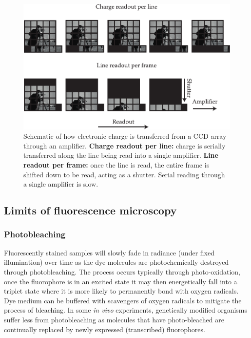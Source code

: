 \begin{figure}
    \centering
    \includegraphics{./sensor_chips}
    \caption[Schematic of how electronic charge is transferred from a \gls{CCD} array through an amplifier]{Schematic of how electronic charge is transferred from a \gls{CCD} array through an amplifier.
    \textbf{Charge readout per line:} charge is serially transferred along the line being read into a single amplifier.
    \textbf{Line readout per frame:} once the line is read, the entire frame is shifted down to be read, acting as a shutter.
    Serial reading through a single amplifier is slow.}\label{fig:sensor_chips}
\end{figure}



\subsection{Limits of fluorescence microscopy}

\subsubsection{Photobleaching}

Fluorescently stained samples will slowly fade in radiance (under fixed illumination) over time as the dye molecules are photochemically destroyed through photobleaching.
The process occurs typically through photo-oxidation, once the \gls{fluorophore} is in an excited state it may then energetically fall into a triplet state where it is more likely to permanently bond with oxygen radicals.
Dye medium can be buffered with scavengers of oxygen radicals to mitigate the process of bleaching.
In some \emph{in vivo} experiments, genetically modified organisms suffer less from photobleaching as molecules that have photo-bleached are continually replaced by newly expressed (transcribed) \gls{fluorophore}s.

